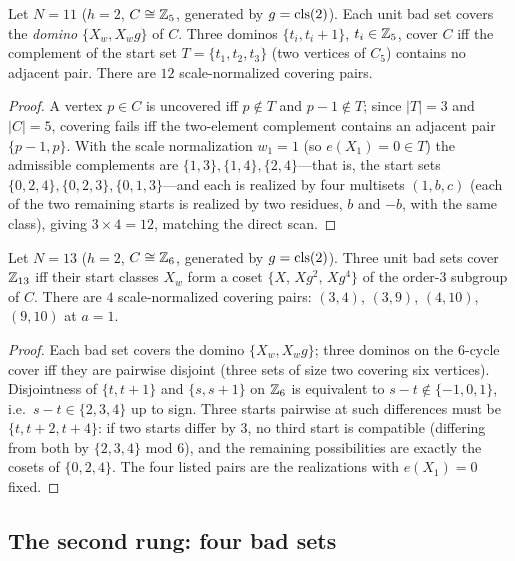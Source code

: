 \begin{theorem}\label{thm:K11}
Let $N=11$ ($h=2$, $C\cong\mathbb{Z}_5$, generated by $g=\operatorname{cls}(2)$). Each unit
bad set covers the \emph{domino} $\{X_w,X_w g\}$ of $C$. Three dominos
$\{t_i,t_i+1\}$, $t_i\in\mathbb{Z}_5$, cover $C$ iff the complement of the start
set $T=\{t_1,t_2,t_3\}$ (two vertices of $C_5$) contains no adjacent
pair. There are $12$ scale-normalized covering pairs.
\end{theorem}

\begin{proof}
A vertex $p\in C$ is uncovered iff $p\notin T$ and $p-1\notin T$; since
$|T|=3$ and $|C|=5$, covering fails iff the two-element complement
contains an adjacent pair $\{p-1,p\}$. With the scale normalization
$w_1=1$ (so $e(X_1)=0\in T$) the admissible complements are
$\{1,3\},\{1,4\},\{2,4\}$---that is, the start sets
$\{0,2,4\},\{0,2,3\},\{0,1,3\}$---and each is realized by four
multisets $(1,b,c)$ (each of the two remaining starts is realized by two
residues, $b$ and $-b$, with the same class), giving $3\times 4=12$,
matching the direct scan.
\end{proof}

\begin{theorem}\label{thm:K13}
Let $N=13$ ($h=2$, $C\cong\mathbb{Z}_6$, generated by $g=\operatorname{cls}(2)$). Three unit
bad sets cover $\mathbb{Z}_{13}$ iff their start classes $X_w$ form a coset
$\{X,\,Xg^2,\,Xg^4\}$ of the order-$3$ subgroup of $C$. There are $4$
scale-normalized covering pairs: $(3,4)$, $(3,9)$, $(4,10)$, $(9,10)$ at
$a=1$.
\end{theorem}

\begin{proof}
Each bad set covers the domino $\{X_w,X_wg\}$; three dominos on the
$6$-cycle cover iff they are pairwise disjoint (three sets of size two
covering six vertices). Disjointness of $\{t,t+1\}$ and $\{s,s+1\}$ on
$\mathbb{Z}_6$ is equivalent to $s-t\notin\{-1,0,1\}$, i.e.\ $s-t\in\{2,3,4\}$
up to sign. Three starts pairwise at such differences must be
$\{t,t+2,t+4\}$: if two starts differ by $3$, no third start is compatible
(differing from both by $\{2,3,4\}$ mod $6$), and the remaining
possibilities are exactly the cosets of $\{0,2,4\}$. The four listed
pairs are the realizations with $e(X_1)=0$ fixed.
\end{proof}

\subsection{The second rung: four bad sets}\label{sec:K5}

